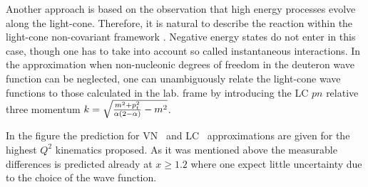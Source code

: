  Another approach is based on the observation that high energy processes
evolve along the light-cone.  Therefore, it is natural to describe the 
reaction within the light-cone non-covariant framework \cite{Frankfurt:1981mk}. 
Negative energy states do not enter in this case, though one has to take into 
account so called instantaneous interactions.
In the approximation when non-nucleonic degrees of freedom in the
deuteron wave function can be neglected, one can unambiguously relate
the light-cone wave functions to those calculated in the lab. frame
by introducing the LC $pn$ relative three momentum
$k=\sqrt{{m^2+p_t^2\over \alpha(2-\alpha)} - m^2}$.

In the figure the prediction for VN~\cite{Sargsian:2009hf} and LC~\cite{Frankfurt:1993sp} approximations are given 
for the highest $Q^2$ kinematics proposed. As it was mentioned above the measurable 
differences is predicted already at $x\ge 1.2$ where one expect little uncertainty due 
to the choice of the wave function.  
 
 



